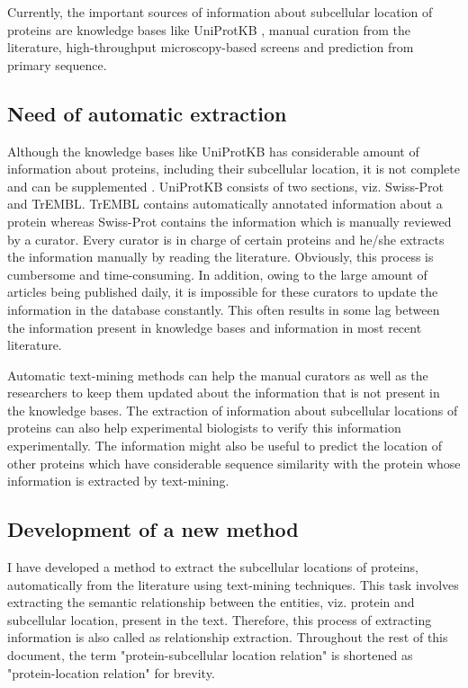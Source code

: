 Currently, the important sources of information about subcellular location of proteins are knowledge bases like UniProtKB \cite{magrane2011uniprot}, manual curation from the literature, high-throughput microscopy-based screens and prediction from primary sequence.

\subsection{Need of automatic extraction}

Although the knowledge bases like UniProtKB \cite{magrane2011uniprot} has considerable amount of information about proteins, including their subcellular location, it is not complete and can be supplemented \cite{goldberg2015linked}. UniProtKB consists of two sections, viz. Swiss-Prot and TrEMBL. TrEMBL contains automatically annotated information about a protein whereas Swiss-Prot contains the information which is manually reviewed by a curator. Every curator is in charge of certain proteins and he/she extracts the information manually by reading the literature. Obviously, this process is cumbersome and time-consuming. In addition, owing to the large amount of articles being published daily, it is impossible for these curators to update the information in the database constantly. This often results in some lag between the information present in knowledge bases and information in most recent literature.

Automatic text-mining methods can help the manual curators as well as the researchers to keep them updated about the information that is not present in the knowledge bases. The extraction of information about subcellular locations of proteins can also help experimental biologists to verify this information experimentally. The information might also be useful to predict the location of other proteins which have considerable sequence similarity with the protein whose information is extracted by text-mining.

\subsection{Development of a new method}

I have developed a method to extract the subcellular locations of proteins, automatically from the literature using text-mining techniques. This task involves extracting the semantic relationship between the entities, viz. protein and subcellular location, present in the text. Therefore, this process of extracting information is also called as relationship extraction. Throughout the rest of this document, the term "protein-subcellular location relation" is shortened  as "protein-location relation" for brevity.

